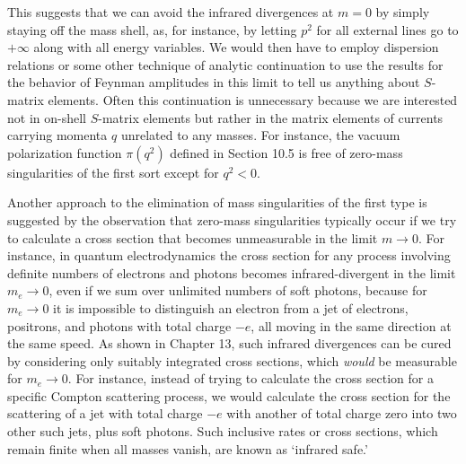 This suggests that we can avoid the infrared divergences at $m=0$ by simply
staying off the mass shell, as, for instance, by letting $p^2$ for all
external lines go to $+\infty$ along with all energy variables. We would then
have to employ dispersion relations or some other technique of analytic
continuation to use the results for the behavior of Feynman amplitudes in
this limit to tell us anything about $S$-matrix elements. Often this
continuation is unnecessary because we are interested not in on-shell
$S$-matrix elements but rather in the matrix elements of currents carrying
momenta $q$ unrelated to any masses. For instance, the vacuum polarization
function $\pi(q^2)$ defined in Section 10.5 is free of zero-mass singularities
of the first sort except for $q^2<0$.

Another approach to the elimination of mass singularities of the first type
is suggested by the observation that zero-mass singularities typically occur
if we try to calculate a cross section that becomes unmeasurable in the limit
$m\to0$. For instance, in quantum electrodynamics the cross section for any
process involving definite numbers of electrons and photons becomes
infrared-divergent in the limit $m_e\to0$, even if we sum over unlimited
numbers of soft photons, because for $m_e\to0$ it is impossible to
distinguish an electron from a jet of electrons, positrons, and photons with
total charge $-e$, all moving in the same direction at the same speed. As
shown in Chapter 13, such infrared divergences can be cured by considering
only suitably integrated cross sections, which \emph{would} be measurable
for $m_e\to0$. For instance, instead of trying to calculate the cross section
for a specific Compton scattering process, we would calculate the cross
section for the scattering of a jet with total charge $-e$ with another of
total charge zero into two other such jets, plus soft photons. Such inclusive
rates or cross sections, which remain finite when all masses vanish, are
known as `infrared safe.'

